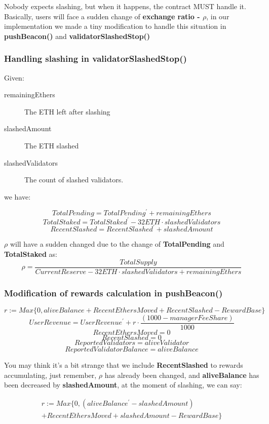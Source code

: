 \documentclass{article}
\begin{document}
Nobody expects slashing, but when it happens, the contract MUST handle it. Basically, users will face a sudden change of \textbf{exchange ratio - $\rho$}, in our implementation we made a tiny modification to handle this situation in \textbf{pushBeacon()} and \textbf{validatorSlashedStop()}

\subsubsection{Handling slashing in validatorSlashedStop()}
Given:
\begin{description}
\item[remainingEthers] The ETH left after slashing
\item[slashedAmount] The ETH slashed
\item[slashedValidators] The count of slashed validators.
\end{description}
we have:
\begin{theorem}
\[TotalPending = TotalPending^{\prime} + remainingEthers \]
\[TotalStaked = TotalStaked^{\prime} - 32 ETH \cdot slashedValidators \]
\[RecentSlashed = RecentSlashed^{\prime} +  slashedAmount \]
\end{theorem}

$\rho$ will have a sudden changed due to the change of \textbf{TotalPending} and \textbf{TotalStaked} as:
\[\rho = \frac{TotalSupply}{CurrentReserve - 32 ETH \cdot slashedValidators + remainingEthers } \]

\subsubsection{Modification of rewards calculation in pushBeacon()}
\begin{theorem}
\[r := Max\{0, aliveBalance + RecentEthersMoved + RecentSlashed - RewardBase\}\]
\[UserRevenue = UserRevenue^{\prime} + r \cdot \frac{(1000 - managerFeeShare)}{1000}\]
\[RecentEthersMoved = 0\]
\[RecentSlashed = 0\]
\[ReportedValidators = aliveValidator\]
\[ReportedValidatorBalance = aliveBalance\]
\end{theorem}
You may think it's a bit strange that we include \textbf{RecentSlashed} to rewards accumulating, just remember, $\rho$ has already been changed, and 
\textbf{aliveBalance} has been decreased by \textbf{slashedAmount}, at the moment of slashing, we can say:

\begin{multline}
r := Max\{0, (aliveBalance^{\prime} - slashedAmount) \\
+ RecentEthersMoved + slashedAmount - RewardBase\}
\end{multline}
\end{document}
